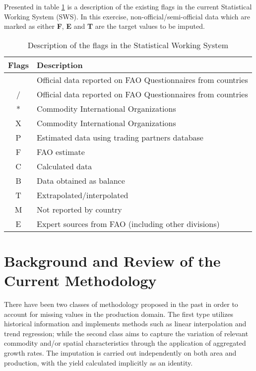 \documentclass[nojss]{jss}\usepackage[]{graphicx}\usepackage[]{color}
\begin{document}
Presented in table \ref{tab:swsflag} is a description of the existing
flags in the current Statistical Working System (SWS). In this
exercise, non-official/semi-official data which are marked as either
\textbf{F}, \textbf{E} and \textbf{T} are the target values to be
imputed.

\begin{table}[h!]
  \label{tab:swsflag}
  \caption{Description of the flags in the Statistical Working System}
  \begin{center}
    \begin{tabular}{|c||p{12cm}|}
      \hline
      Flags & Description\\
      \hline
      & Official data reported on FAO Questionnaires from countries\\
      / & Official data reported on FAO Questionnaires from countries\\
      * & Commodity International Organizations\\
      X & Commodity International Organizations\\
      P & Estimated data using trading partners database\\
      F & FAO estimate\\
      C & Calculated data\\
      B & Data obtained as balance\\
      T & Extrapolated/interpolated\\
      M & Not reported by country\\
      E & Expert sources from FAO (including other divisions)\\
      \hline
    \end{tabular}
  \end{center}  
\end{table}

\FloatBarrier

\section{Background and Review of the Current Methodology}

There have been two classes of methodology proposed in the past in
order to account for missing values in the production domain. The
first type utilizes historical information and implements methods such
as linear interpolation and trend regression; while the second class
aims to capture the variation of relevant commodity
and/or spatial characteristics through the application of
aggregated growth rates. The imputation is carried out independently
on both area and production, with the yield calculated implicitly as
an identity.
\end{document}
